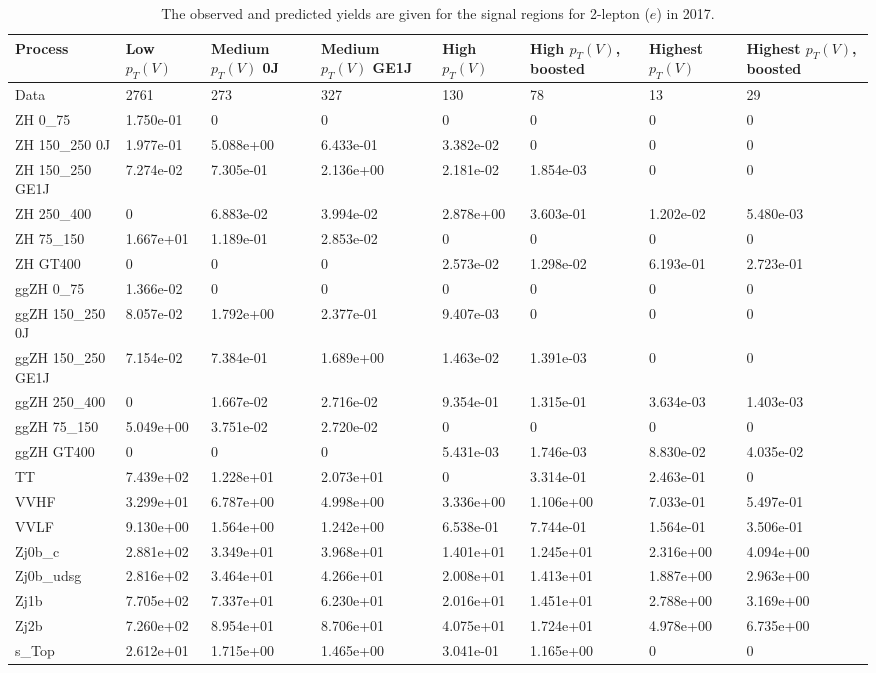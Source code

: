 \begin{table}
\centering
\caption[2017 2-lepton ($e$) signal selection yields]{
                  The observed and predicted yields are given for the
                  signal regions for 2-lepton ($e$) in 2017.
                  }
{\footnotesize
\begin{tabularx}{\textwidth}{|X|X|X|X|X|X|X|X|}
\hline
Process & Low $p_{T}(V)$ & Medium $p_{T}(V)$ 0J & Medium $p_{T}(V)$ GE1J & High $p_{T}(V)$ & High $p_{T}(V)$, boosted & Highest $p_{T}(V)$ & Highest $p_{T}(V)$, boosted \\
\hline
Data & 2761 & 273 & 327 & 130 & 78 & 13 & 29 \\
\hline
ZH 0\_75 & 1.750e-01 & 0 & 0 & 0 & 0 & 0 & 0 \\
ZH 150\_250 0J & 1.977e-01 & 5.088e+00 & 6.433e-01 & 3.382e-02 & 0 & 0 & 0 \\
ZH 150\_250 GE1J & 7.274e-02 & 7.305e-01 & 2.136e+00 & 2.181e-02 & 1.854e-03 & 0 & 0 \\
ZH 250\_400 & 0 & 6.883e-02 & 3.994e-02 & 2.878e+00 & 3.603e-01 & 1.202e-02 & 5.480e-03 \\
ZH 75\_150 & 1.667e+01 & 1.189e-01 & 2.853e-02 & 0 & 0 & 0 & 0 \\
ZH GT400 & 0 & 0 & 0 & 2.573e-02 & 1.298e-02 & 6.193e-01 & 2.723e-01 \\
ggZH 0\_75 & 1.366e-02 & 0 & 0 & 0 & 0 & 0 & 0 \\
ggZH 150\_250 0J & 8.057e-02 & 1.792e+00 & 2.377e-01 & 9.407e-03 & 0 & 0 & 0 \\
ggZH 150\_250 GE1J & 7.154e-02 & 7.384e-01 & 1.689e+00 & 1.463e-02 & 1.391e-03 & 0 & 0 \\
ggZH 250\_400 & 0 & 1.667e-02 & 2.716e-02 & 9.354e-01 & 1.315e-01 & 3.634e-03 & 1.403e-03 \\
ggZH 75\_150 & 5.049e+00 & 3.751e-02 & 2.720e-02 & 0 & 0 & 0 & 0 \\
ggZH GT400 & 0 & 0 & 0 & 5.431e-03 & 1.746e-03 & 8.830e-02 & 4.035e-02 \\
\hline
TT & 7.439e+02 & 1.228e+01 & 2.073e+01 & 0 & 3.314e-01 & 2.463e-01 & 0 \\
VVHF & 3.299e+01 & 6.787e+00 & 4.998e+00 & 3.336e+00 & 1.106e+00 & 7.033e-01 & 5.497e-01 \\
VVLF & 9.130e+00 & 1.564e+00 & 1.242e+00 & 6.538e-01 & 7.744e-01 & 1.564e-01 & 3.506e-01 \\
Zj0b\_c & 2.881e+02 & 3.349e+01 & 3.968e+01 & 1.401e+01 & 1.245e+01 & 2.316e+00 & 4.094e+00 \\
Zj0b\_udsg & 2.816e+02 & 3.464e+01 & 4.266e+01 & 2.008e+01 & 1.413e+01 & 1.887e+00 & 2.963e+00 \\
Zj1b & 7.705e+02 & 7.337e+01 & 6.230e+01 & 2.016e+01 & 1.451e+01 & 2.788e+00 & 3.169e+00 \\
Zj2b & 7.260e+02 & 8.954e+01 & 8.706e+01 & 4.075e+01 & 1.724e+01 & 4.978e+00 & 6.735e+00 \\
s\_Top & 2.612e+01 & 1.715e+00 & 1.465e+00 & 3.041e-01 & 1.165e+00 & 0 & 0 \\
\hline
\end{tabularx}
}
\label{tab:sr-Zee-2017}
\end{table}

